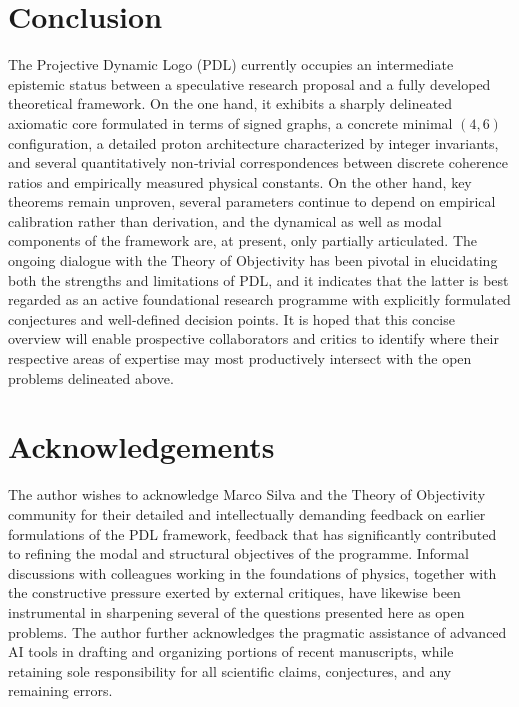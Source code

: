 \documentclass[11pt,a4paper]{article}
\begin{document}
\section{Conclusion}
The Projective Dynamic Logo (PDL) currently occupies an intermediate epistemic status between a speculative research proposal and a fully developed theoretical framework.\cite{Laubscher2026FullPDL} On the one hand, it exhibits a sharply delineated axiomatic core formulated in terms of signed graphs, a concrete minimal $(4,6)$ configuration, a detailed proton architecture characterized by integer invariants, and several quantitatively non‑trivial correspondences between discrete coherence ratios and empirically measured physical constants.\cite{Laubscher2026IntroPDL,Laubscher2026Alpha,Laubscher2026TopologicalReformulation} On the other hand, key theorems remain unproven, several parameters continue to depend on empirical calibration rather than derivation, and the dynamical as well as modal components of the framework are, at present, only partially articulated.\cite{Laubscher2026FullPDL,Laubscher2026Exponent18,Laubscher2026DialogueTO} The ongoing dialogue with the Theory of Objectivity has been pivotal in elucidating both the strengths and limitations of PDL, and it indicates that the latter is best regarded as an active foundational research programme with explicitly formulated conjectures and well‑defined decision points.\cite{Laubscher2026DialogueTO} It is hoped that this concise overview will enable prospective collaborators and critics to identify where their respective areas of expertise may most productively intersect with the open problems delineated above.

\section*{Acknowledgements}
The author wishes to acknowledge Marco Silva and the Theory of Objectivity community for their detailed and intellectually demanding feedback on earlier formulations of the PDL framework, feedback that has significantly contributed to refining the modal and structural objectives of the programme.\cite{Laubscher2026DialogueTO} Informal discussions with colleagues working in the foundations of physics, together with the constructive pressure exerted by external critiques, have likewise been instrumental in sharpening several of the questions presented here as open problems. The author further acknowledges the pragmatic assistance of advanced AI tools in drafting and organizing portions of recent manuscripts, while retaining sole responsibility for all scientific claims, conjectures, and any remaining errors.\cite{Laubscher2026FullPDL}



\end{document}
